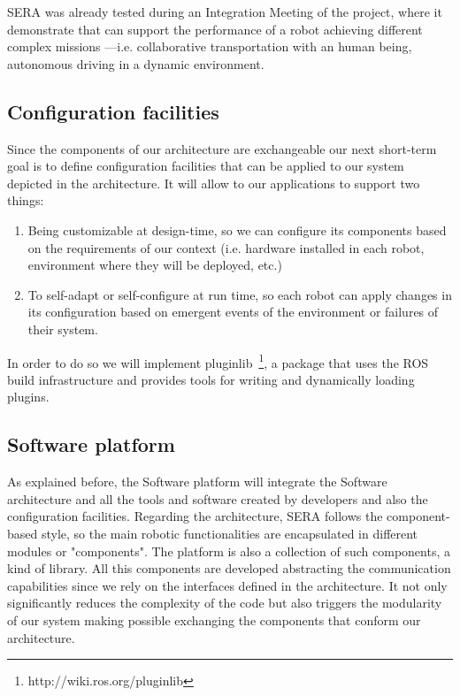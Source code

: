 SERA was already tested during an Integration Meeting of the project, where it demonstrate that can support the performance of a robot achieving different complex missions ---i.e. collaborative transportation with an human being, autonomous driving in a dynamic environment.


\subsection{Configuration facilities}

Since the components of our architecture are exchangeable our next short-term goal is to define configuration facilities that can be applied to our system depicted in the architecture.
It will allow to our applications to support two things:
\begin{enumerate}
\item Being customizable at design-time, so we can configure its components based on the requirements of our context (i.e. hardware installed in each robot, environment where they will be deployed, etc.)
\item To self-adapt or self-configure at run time, so each robot can apply changes in its configuration based on emergent events of the environment or failures of their system.
\end{enumerate}

In order to do so we will implement pluginlib~\footnote{http://wiki.ros.org/pluginlib}, a package that uses the ROS build infrastructure and provides tools for writing and dynamically loading plugins.

\subsection{Software platform}

As explained before, the Software platform will integrate the Software architecture and all the tools and software created by developers and also the configuration facilities.
Regarding the architecture, SERA follows the component-based style, so the main robotic functionalities are encapsulated in different modules or "components".
The platform is also a collection of such components, a kind of library.
All this components are developed abstracting the communication capabilities since we rely on the interfaces defined in the architecture.
It not only significantly reduces the complexity of the code but also triggers the modularity of our system making possible exchanging the components that conform our architecture.


